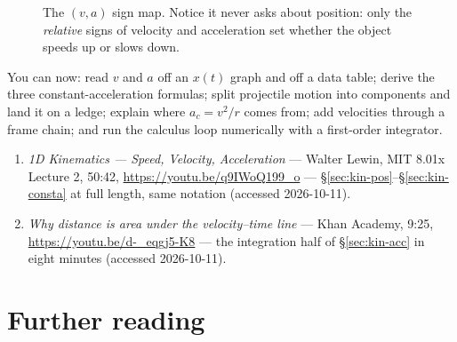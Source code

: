 \begin{figure}[htbp]\centering

\caption{The $(v,a)$ sign map. Notice it never asks about position: only the
\emph{relative} signs of velocity and acceleration set whether the object
speeds up or slows down.}
\label{fig:signmap}
\end{figure}

\begin{wins}
You can now: read $v$ and $a$ off an $x(t)$ graph and off a data table;
derive the three constant-acceleration formulas; split projectile motion into
components and land it on a ledge; explain where $a_c=v^{2}/r$ comes from;
add velocities through a frame chain; and run the calculus loop numerically
with a first-order integrator.
\end{wins}


\begin{rulebox}
\begin{enumerate}
\item \emph{1D Kinematics --- Speed, Velocity, Acceleration} --- Walter Lewin,
MIT 8.01x Lecture 2, 50:42, \url{https://youtu.be/q9IWoQ199_o} ---
\S\ref{sec:kin-pos}--\S\ref{sec:kin-consta} at full length, same notation
(accessed 2026-10-11).
\item \emph{Why distance is area under the velocity--time line} --- Khan
Academy, 9:25, \url{https://youtu.be/d-_eqgj5-K8} --- the integration half of
\S\ref{sec:kin-acc} in eight minutes (accessed 2026-10-11).
\end{enumerate}
\end{rulebox}

\section*{Further reading}

